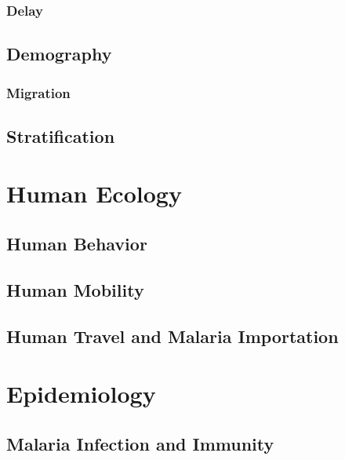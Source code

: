 \documentclass[
]{book}
\begin{document}
\hypertarget{delay}{%
\section{Delay}\label{delay}}

\hypertarget{demography}{%
\chapter{Demography}\label{demography}}

\hypertarget{migration-1}{%
\section{Migration}\label{migration-1}}

\hypertarget{stratification-1}{%
\chapter{Stratification}\label{stratification-1}}

\hypertarget{part-human-ecology}{%
\part{Human Ecology}\label{part-human-ecology}}

\hypertarget{human-behavior}{%
\chapter{Human Behavior}\label{human-behavior}}

\hypertarget{human-mobility}{%
\chapter{Human Mobility}\label{human-mobility}}

\hypertarget{human-travel-and-malaria-importation}{%
\chapter{Human Travel and Malaria Importation}\label{human-travel-and-malaria-importation}}

\hypertarget{part-epidemiology}{%
\part{Epidemiology}\label{part-epidemiology}}

\hypertarget{malaria-infection-and-immunity}{%
\chapter{Malaria Infection and Immunity}\label{malaria-infection-and-immunity}}
\end{document}
